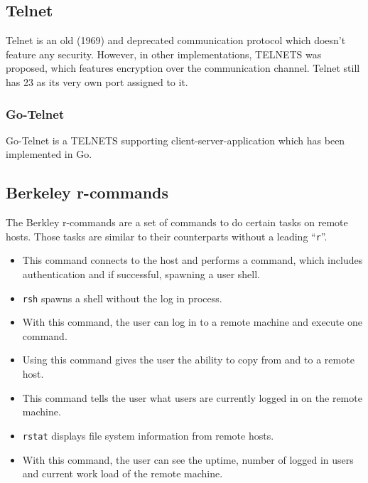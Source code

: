\documentclass[10pt,a4paper,titlepage,twoside,english,final]{zhawreprt}
\begin{document}
\subsection{Telnet}\label{ssec:Telnet}
Telnet\citep{rfc15,rfc854} is an old (1969) and deprecated communication protocol which doesn't feature any security.
However, in other implementations, \gls{TELNETS} was proposed, which features encryption over the communication channel.
Telnet still has 23 as its very own \gls{port} assigned to it.
\subsubsection{Go-Telnet}
Go-Telnet\citep{gotelnet} is a \gls{TELNETS} supporting client-server-application which has been implemented in \gls{Go}.

\subsection{Berkeley r-commands}\label{ssec:BerkeleyRCommands}
The Berkley r-commands are a set of commands to do certain tasks on remote hosts.
Those tasks are similar to their counterparts without a leading ``\texttt{r}''.
\begin{itemize}
\item \cite{rlogin}

This command connects to the host and performs a \cite{login} command, which includes authentication and if successful, spawning a user \gls{shell}.
\item \cite{rsh}

\texttt{rsh} spawns a \gls{shell} without the log in process.
\item \cite{rexec}

With this command, the user can log in to a remote machine and execute one command.
\item \cite{rcp}

Using this command gives the user the ability to copy from and to a remote host.
\item \cite{rwho}

This command tells the user what users are currently logged in on the remote machine.
\item \cite{rstat}

\texttt{rstat} displays file system information from remote hosts.
\item \cite{ruptime}

With this command, the user can see the \gls{uptime}, number of logged in users and current work load of the remote machine.
\end{itemize}
\end{document}
